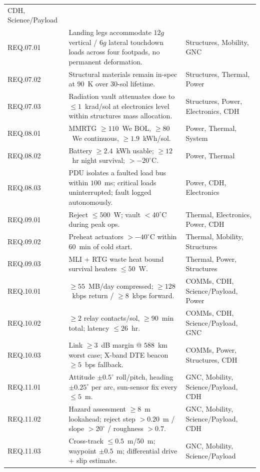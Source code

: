 \documentclass[11pt]{article}
\begin{document}
\begin{appendices}
\begin{longtable}{p{1.6cm}p{8.6cm}p{3cm}}
CDH, Science/Payload \\
REQ.07.01 & Landing legs accommodate $12g$ vertical / $6g$ lateral touchdown loads across four
footpads, no permanent deformation. & Structures, Mobility, GNC \\
REQ.07.02 & Structural materials remain in-spec at $90$~K over 30-sol lifetime. & Structures,
Thermal, Power \\
REQ.07.03 & Radiation vault attenuates dose to $\leq 1$~krad/sol at electronics level within
structures mass allocation. & Structures, Power, Electronics, CDH \\
REQ.08.01 & MMRTG $\geq 110$~We BOL, $\geq 80$~We continuous, $\geq 1.9$~kWh/sol. & Power,
Thermal, System \\
REQ.08.02 & Battery $\geq 2.4$~kWh usable; $\geq 12$~hr night survival; $>-20^\circ$C. & Power,
Thermal \\
REQ.08.03 & PDU isolates a faulted load bus within $100$~ms; critical loads uninterrupted; fault
logged autonomously. & Power, CDH, Electronics \\
REQ.09.01 & Reject $\leq 500$~W; vault $<40^\circ$C during peak ops. & Thermal, Electronics,
Power, CDH \\
REQ.09.02 & Preheat actuators $>-40^\circ$C within $60$~min of cold start. & Thermal, Mobility,
Structures \\
REQ.09.03 & MLI + RTG waste heat bound survival heaters $\leq 50$~W. & Thermal, Power,
Structures \\
REQ.10.01 & $\geq 55$~MB/day compressed; $\geq 128$~kbps return / $\geq 8$~kbps forward. &
COMMs, CDH, Science/Payload, Power \\
REQ.10.02 & $\geq 2$ relay contacts/sol, $\geq 90$~min total; latency $\leq 26$~hr. & COMMs,
CDH, Science/Payload, GNC \\
REQ.10.03 & Link $\geq 3$~dB margin @ $588$~km worst case; X-band DTE beacon $\geq 5$~bps
fallback. & COMMs, Power, Structures, CDH \\
REQ.11.01 & Attitude $\pm 0.5^\circ$ roll/pitch, heading $\pm 0.25^\circ$ per arc, sun-sensor
fix every $\leq 5$~m. & GNC, Mobility, Science/Payload, CDH \\
REQ.11.02 & Hazard assessment $\geq 8$~m lookahead; reject step $>0.20$~m / slope $>20^\circ$ /
roughness $>0.7$. & GNC, Mobility, Science/Payload, CDH \\
REQ.11.03 & Cross-track $\leq 0.5$~m/50~m; waypoint $\pm 0.5$~m; differential drive + slip
estimate. & GNC, Mobility, Science/Payload \\

\end{longtable}
\end{appendices}
\end{document}
